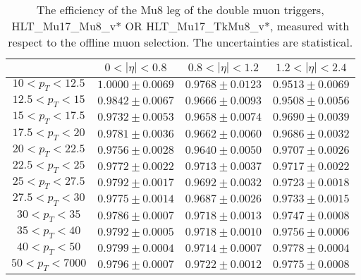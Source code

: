 \begin{table}[!ht]
\begin{center}
\begin{tabular}{c|c|c|c}
\hline & $0 < |\eta| < 0.8$ & $0.8 < |\eta| < 1.2$ & $1.2 < |\eta| < 2.4$  \\
\hline
$ 10 < p_T < 12.5$ & $1.0000 \pm 0.0069$ & $0.9768 \pm 0.0123$ & $0.9513 \pm 0.0069$  \\
$12.5 < p_T <  15$ & $0.9842 \pm 0.0067$ & $0.9666 \pm 0.0093$ & $0.9508 \pm 0.0056$  \\
$ 15 < p_T < 17.5$ & $0.9732 \pm 0.0053$ & $0.9658 \pm 0.0074$ & $0.9690 \pm 0.0039$  \\
$17.5 < p_T <  20$ & $0.9781 \pm 0.0036$ & $0.9662 \pm 0.0060$ & $0.9686 \pm 0.0032$  \\
$ 20 < p_T < 22.5$ & $0.9756 \pm 0.0028$ & $0.9640 \pm 0.0050$ & $0.9707 \pm 0.0026$  \\
$22.5 < p_T <  25$ & $0.9772 \pm 0.0022$ & $0.9713 \pm 0.0037$ & $0.9717 \pm 0.0022$  \\
$ 25 < p_T < 27.5$ & $0.9792 \pm 0.0017$ & $0.9692 \pm 0.0032$ & $0.9723 \pm 0.0018$  \\
$27.5 < p_T <  30$ & $0.9775 \pm 0.0014$ & $0.9687 \pm 0.0026$ & $0.9733 \pm 0.0015$  \\
$ 30 < p_T <  35$ & $0.9786 \pm 0.0007$ & $0.9718 \pm 0.0013$ & $0.9747 \pm 0.0008$  \\
$ 35 < p_T <  40$ & $0.9792 \pm 0.0005$ & $0.9718 \pm 0.0010$ & $0.9756 \pm 0.0006$  \\
$ 40 < p_T <  50$ & $0.9799 \pm 0.0004$ & $0.9714 \pm 0.0007$ & $0.9778 \pm 0.0004$  \\
$ 50 < p_T < 7000$ & $0.9796 \pm 0.0007$ & $0.9722 \pm 0.0012$ & $0.9775 \pm 0.0008$  \\
\hline
\hline
\end{tabular}
\caption{The efficiency of the Mu8 leg of the double muon triggers,
HLT\_Mu17\_Mu8\_v* OR HLT\_Mu17\_TkMu8\_v*,
measured with respect to the offline muon selection. 
The uncertainties are statistical.}
\label{tab:eff_muon_trail_dbl}
\end{center}
\end{table}


